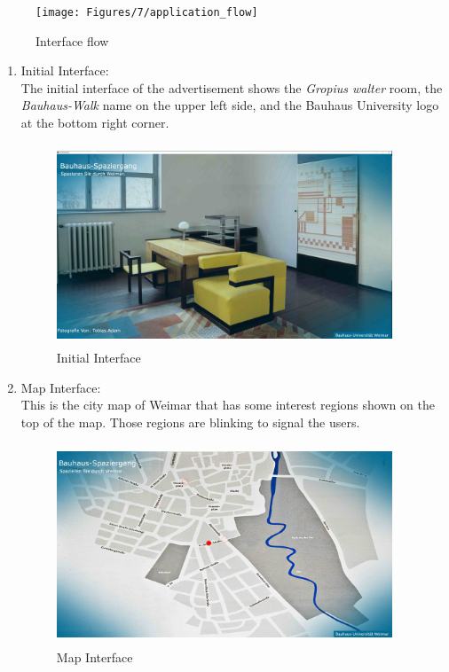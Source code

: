 \begin{figure}[H]
    \centering
    \texttt{[image: Figures/7/application\_flow]}
    \caption{Interface flow}%
    \label{fig:InterfaceFlow}%
\end{figure}

\begin{enumerate}

\item Initial Interface: \\
The initial interface of the advertisement shows the \emph{Gropius walter} room, the \emph{Bauhaus-Walk} name on the upper left side, and the Bauhaus University logo at the bottom right corner.

\begin{figure}[H]
    \centering
    \includegraphics[width=100mm,height=60mm]{Figures/7/initialpage}
    \caption{Initial Interface}%
    \label{fig:adInitialpage}%
\end{figure}

\item Map Interface: \\
This is the city map of Weimar that has some interest regions shown on the top of the map. Those regions are blinking to signal the users.

\begin{figure}[H]
    \centering
    \includegraphics[width=100mm,height=60mm]{Figures/7/map}
    \caption{Map Interface}%
    \label{fig:adSecondpage1}%
\end{figure}


\end{enumerate}
